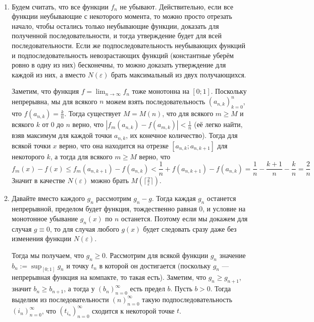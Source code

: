 \documentclass[12pt,a4paper]{article}
\begin{document}
    \begin{enumproblem}\ItemedProblem\ 
        \begin{enumerate}
            \item Будем считать, что все функции $f_n$ не убывают. Действительно, если все функции неубывающие с некоторого момента, то можно просто отрезать начало, чтобы остались только неубывающие функции, доказать для полученной последовательности, и тогда утверждение будет для всей последовательности. Если же подпоследовательность неубывающих функций и подпоследовательность невозрастающих функций (константные уберём ровно в одну из них) бесконечны, то можно доказать утверждение для каждой из них, а вместо $N(\varepsilon)$ брать максимальный из двух получающихся.
            
                Заметим, что функция $f = \lim_{n \to \infty} f_n$ тоже монотонна на $[0; 1]$. Поскольку непрерывна, мы для всякого $n$ можем взять последовательность $(a_{n, k})_{k=0}^n$, что $f(a_{n, k}) = \frac{k}{n}$. Тогда существует $M = M(n)$, что для всякого $m \geqslant M$ и всякого $k$ от $0$ до $n$ верно, что $|f_m(a_{n, k}) - f(a_{m, k})| < \frac{1}{n}$ (её легко найти, взяв максимум для каждой точки $a_{n, k}$, их конечное количество). Тогда для всякой точки $x$ верно, что она находится на отрезке $[a_{n, k}; a_{n, k+1}]$ для некоторого $k$, а тогда для всякого $m \geqslant M$ верно, что
                \[
                    f_m(x) - f(x)
                    \leqslant f_m(a_{n, k+1}) - f(a_{n, k})
                    < \frac{1}{n} + f(a_{n, k+1}) - f(a_{n, k})
                    = \frac{1}{n} - \frac{k+1}{n} - \frac{k}{n}
                    = \frac{2}{n}
                \]
                Значит в качестве $N(\varepsilon)$ можно брать $M(\lceil\frac{2}{\varepsilon}\rceil)$.

            \item Давайте вместо каждого $g_n$ рассмотрим $g_n - g$. Тогда каждая $g_n$ останется непрерывной, пределом будет функция, тождественно равная $0$, и условие на монотонное убывание $g_n(x)$ по $n$ останется. Поэтому если мы докажем для случая $g \equiv 0$, то для случая любого $g(x)$ будет следовать сразу даже без изменения функции $N(\varepsilon)$.

                Тогда мы получаем, что $g_n \geqslant 0$. Рассмотрим для всякой функции $g_n$ значение $b_n := \sup_{[0; 1]} g_n$ и точку $t_n$ в которой он достигается (поскольку $g_n$ --- непрерывная функция на компакте, то такая есть). Заметим, что $g_n \geqslant g_{n+1}$, значит $b_n \geqslant b_{n+1}$, а тогда у $(b_n)_{n=0}^\infty$ есть предел $b$. Пусть $b > 0$. Тогда выделим из последовательности $(n)_{n=0}^\infty$ такую подпоследовательность $(i_n)_{n=0}^\infty$, что $(t_{i_n})_{n=0}^\infty$ сходится к некоторой точке $t$.
                

\end{enumerate}
\end{enumproblem}
\end{document}
